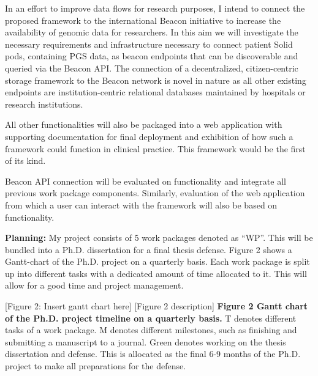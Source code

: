 \documentclass[a4paper,11pt]{article}
\begin{document}
In an effort to improve data flows for research purposes, I intend to connect the proposed framework to the international Beacon initiative \cite{rambla_beacon_2022} to increase the availability of genomic data for researchers. 
In this aim we will investigate the necessary requirements and infrastructure necessary to connect patient Solid pods, containing PGS data, as beacon endpoints that can be discoverable and queried via the Beacon API. 
The connection of a decentralized, citizen-centric storage framework to the Beacon network is novel in nature as all other existing endpoints are institution-centric relational databases maintained by hospitals or research institutions.

All other functionalities will also be packaged into a web application with supporting documentation for final deployment and exhibition of how such a framework could function in clinical practice.
This framework would be the first of its kind.

Beacon API connection will be evaluated on functionality and integrate all previous work package components. 
Similarly, evaluation of the web application from which a user can interact with the framework will also be based on functionality.

\textbf{Planning:}
My project consists of 5 work packages denoted as “WP”. 
This will be bundled into a Ph.D. dissertation for a final thesis defense. Figure 2 shows a Gantt-chart of the Ph.D. project on a quarterly basis.  
Each work package is split up into different tasks with a dedicated amount of time allocated to it. 
This will allow for a good time and project management. 

[Figure 2: Insert gantt chart here]
[Figure 2 description]
\textbf{Figure 2 Gantt chart of the Ph.D. project timeline on a quarterly basis.} T denotes different tasks of a work package. M denotes different milestones, such as finishing and submitting a manuscript to a journal. 
Green denotes working on the thesis dissertation and defense. 
This is allocated as the final 6-9 months of the Ph.D. project to make all preparations for the defense. 
\end{document}
